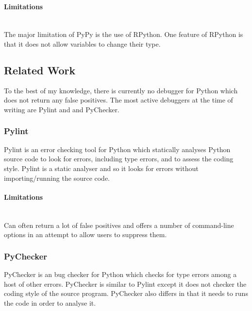 \documentclass[12pt, titlepage]{article}
\begin{document}
\paragraph{Limitations}\mbox{}\\
The major limitation of PyPy is the use of RPython. One feature of RPython is that it does not allow variables to change their type.

\subsection{Related Work}
To the best of my knowledge, there is currently no debugger for Python which does not return any false positives. The most active debuggers at the time of writing are Pylint and and PyChecker.

\subsubsection{Pylint}
Pylint is an error checking tool for Python which statically analyses Python source code to look for errors, including type errors, and to assess the coding style. Pylint is a static analyser and so it looks for errors without importing/running the source code.
\paragraph{Limitations}\mbox{}\\
Can often return a lot of false positives and offers a number of command-line options in an attempt to allow users to suppress them.

\subsubsection{PyChecker}
PyChecker is an bug checker for Python which checks for type errors among a host of other errors. PyChecker is similar to Pylint except it does not checker the coding style of the source program. PyChecker also differs in that it needs to runs the code in order to analyse it.
\end{document}

